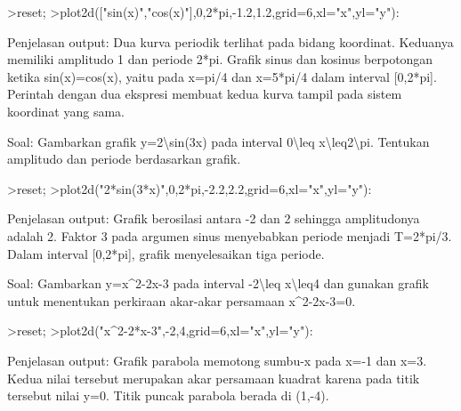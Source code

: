 \documentclass[a4paper,10pt]{article}
\begin{document}
\begin{eulernotebook}
\begin{eulercomment}
\begin{eulercomment}
\begin{eulercomment}
\begin{eulercomment}
\begin{eulercomment}
\begin{eulercomment}
\begin{eulercomment}
\end{eulercomment}
\begin{eulerprompt}
>reset;
>plot2d(["sin(x)","cos(x)"],0,2*pi,-1.2,1.2,grid=6,xl="x",yl="y"):
\end{eulerprompt}
\begin{eulercomment}
Penjelasan output:
Dua kurva periodik terlihat pada bidang koordinat. Keduanya memiliki
amplitudo 1 dan periode 2*pi. Grafik sinus dan kosinus berpotongan
ketika sin(x)=cos(x), yaitu pada x=pi/4 dan x=5*pi/4 dalam interval
[0,2*pi]. Perintah dengan dua ekspresi membuat kedua kurva tampil
pada sistem koordinat yang sama.

\end{eulercomment}
\begin{eulercomment}
Soal:
Gambarkan grafik
\textdollar{}y=2\textbackslash{}sin(3x)\textdollar{}
pada interval \textdollar{}0\textbackslash{}leq x\textbackslash{}leq2\textbackslash{}pi\textdollar{}. Tentukan amplitudo dan periode
berdasarkan grafik.

\end{eulercomment}
\begin{eulerprompt}
>reset;
>plot2d("2*sin(3*x)",0,2*pi,-2.2,2.2,grid=6,xl="x",yl="y"):
\end{eulerprompt}
\begin{eulercomment}
Penjelasan output:
Grafik berosilasi antara -2 dan 2 sehingga amplitudonya adalah 2.
Faktor 3 pada argumen sinus menyebabkan periode menjadi
T=2*pi/3. Dalam interval [0,2*pi], grafik menyelesaikan tiga periode.

\end{eulercomment}
\begin{eulercomment}
Soal:
Gambarkan
\textdollar{}y=x\textasciicircum{}2-2x-3\textdollar{}
pada interval \textdollar{}-2\textbackslash{}leq x\textbackslash{}leq4\textdollar{} dan gunakan grafik untuk menentukan
perkiraan akar-akar persamaan
\textdollar{}x\textasciicircum{}2-2x-3=0\textdollar{}.

\end{eulercomment}
\begin{eulerprompt}
>reset;
>plot2d("x^2-2*x-3",-2,4,grid=6,xl="x",yl="y"):
\end{eulerprompt}
\begin{eulercomment}
Penjelasan output:
Grafik parabola memotong sumbu-x pada x=-1 dan x=3.
Kedua nilai tersebut merupakan akar persamaan kuadrat karena pada
titik tersebut nilai y=0. Titik puncak parabola berada di (1,-4).


\end{eulercomment}
\end{eulercomment}
\end{eulercomment}
\end{eulercomment}
\end{eulercomment}
\end{eulercomment}
\end{eulercomment}
\end{eulernotebook}
\end{document}
